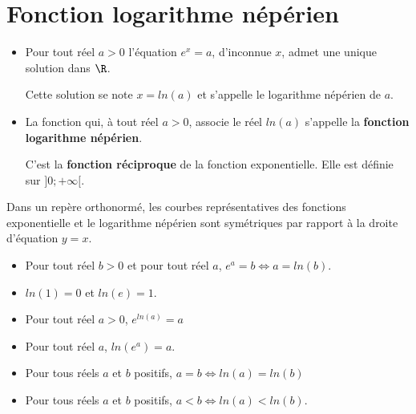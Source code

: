 \documentclass[a4paper]{article}
\begin{document}
\pagebreak
\section{Fonction logarithme népérien}

\begin{definition}{}{}
\begin{itemize}[label=\textbullet]
  \item Pour tout réel $a>0$ l'équation $e^x=a$, d'inconnue $x$, admet une unique solution dans $\R$.

  Cette solution se note $x=ln(a)$ et s'appelle le logarithme népérien de $a$.

  \item La fonction qui, à tout réel $a>0$, associe le réel $ln(a)$ s'appelle la \textbf{fonction logarithme népérien}.

  C'est la \textbf{fonction réciproque} de la fonction exponentielle. Elle est définie sur $]0;+\infty[$.
\end{itemize}
\end{definition}

\begin{propriete}{}{}
  Dans un repère orthonormé, les courbes représentatives des fonctions exponentielle et le logarithme népérien 
  sont symétriques par rapport à la droite d'équation $y=x$.

  \begin{center}
  \end{center}

  
\end{propriete}

\begin{propriete}{}{}
\begin{itemize}[label=\textbullet]
  \item Pour tout réel $b>0$ et pour tout réel $a$, $e^a=b \iff a=ln(b)$.
  \item $ln(1)=0$ et $ln(e)=1$.
  \item Pour tout réel $a>0$, $e^{ln(a)}=a$
  \item Pour tout réel $a$, $ln(e^a)=a$.
  \item Pour tous réels $a$ et $b$ positifs, $a=b \iff ln(a)=ln(b)$
  \item Pour tous réels $a$ et $b$ positifs, $a<b \iff ln(a)<ln(b)$. 
\end{itemize}
\end{propriete}
\end{document}
